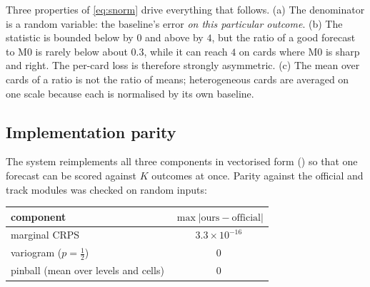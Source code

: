 \begin{remark}
Three properties of \eqref{eq:snorm} drive everything that follows.
(a) The denominator is a random variable: the baseline's error \emph{on this particular outcome}.
(b) The statistic is bounded below by $0$ and above by $4$, but the ratio of a good forecast to M0 is rarely below about $0.3$, while it can
reach $4$ on cards where M0 is sharp and right. The per-card loss is therefore strongly asymmetric.
(c) The mean over cards of a ratio is not the ratio of means; heterogeneous cards are averaged on one scale because each is normalised
by its own baseline.
\end{remark}

\subsection{Implementation parity}

The system reimplements all three components in vectorised form () so that one forecast can be scored
against $K$ outcomes at once. Parity against the official  and track modules was checked on random inputs:
\begin{center}
\begin{tabular}{lc}
\toprule
component & $\max|\text{ours}-\text{official}|$\\
\midrule
marginal CRPS & $3.3\times10^{-16}$\\
variogram ($p=\tfrac12$) & $0$\\
pinball (mean over levels and cells) & $0$\\
\bottomrule
\end{tabular}
\end{center}
